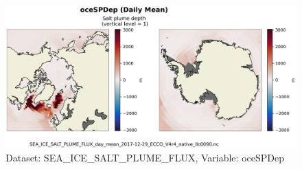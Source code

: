 \begin{figure}[H]
\centering
\includegraphics[scale=0.55]{../images/plots/v4r4/native_plots/Sea-Ice_Salt_Plume_Fluxes/oceSPDep.png}
\caption{Dataset: SEA\_ICE\_SALT\_PLUME\_FLUX, Variable: oceSPDep}
\label{tab:table-SEA_ICE_SALT_PLUME_FLUX_oceSPDep-Plot}
\end{figure}
\newpage
\pagebreak
